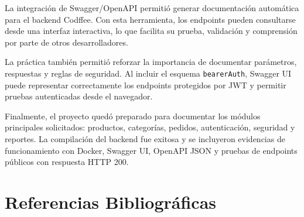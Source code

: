 \documentclass[10pt,a4paper]{article}
\newcommand{\cod}[1]{\texttt{\scriptsize #1}}
\begin{document}
La integración de Swagger/OpenAPI permitió generar documentación automática para el backend Codffee. Con esta herramienta, los endpoints pueden consultarse desde una interfaz interactiva, lo que facilita su prueba, validación y comprensión por parte de otros desarrolladores.

La práctica también permitió reforzar la importancia de documentar parámetros, respuestas y reglas de seguridad. Al incluir el esquema \cod{bearerAuth}, Swagger UI puede representar correctamente los endpoints protegidos por JWT y permitir pruebas autenticadas desde el navegador.

Finalmente, el proyecto quedó preparado para documentar los módulos principales solicitados: productos, categorías, pedidos, autenticación, seguridad y reportes. La compilación del backend fue exitosa y se incluyeron evidencias de funcionamiento con Docker, Swagger UI, OpenAPI JSON y pruebas de endpoints públicos con respuesta HTTP 200.

\section{Referencias Bibliográficas}
\end{document}
